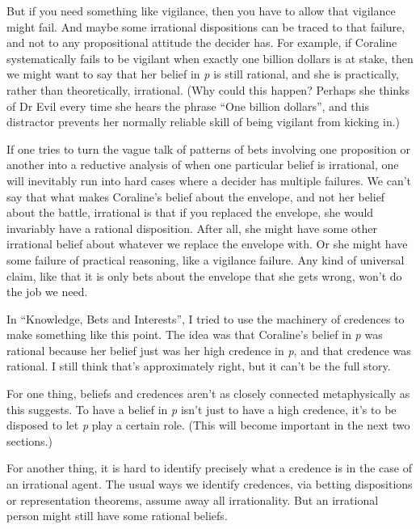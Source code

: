 \documentclass[
  11pt,
]{book}
\begin{document}
But if you need something like vigilance, then you have to allow that vigilance might fail. And maybe some irrational dispositions can be traced to that failure, and not to any propositional attitude the decider has. For example, if Coraline systematically fails to be vigilant when exactly one billion dollars is at stake, then we might want to say that her belief in \emph{p} is still rational, and she is practically, rather than theoretically, irrational. (Why could this happen? Perhaps she thinks of Dr Evil every time she hears the phrase ``One billion dollars'', and this distractor prevents her normally reliable skill of being vigilant from kicking in.)

If one tries to turn the vague talk of patterns of bets involving one proposition or another into a reductive analysis of when one particular belief is irrational, one will inevitably run into hard cases where a decider has multiple failures. We can't say that what makes Coraline's belief about the envelope, and not her belief about the battle, irrational is that if you replaced the envelope, she would invariably have a rational disposition. After all, she might have some other irrational belief about whatever we replace the envelope with. Or she might have some failure of practical reasoning, like a vigilance failure. Any kind of universal claim, like that it is only bets about the envelope that she gets wrong, won't do the job we need.

In ``Knowledge, Bets and Interests'', I tried to use the machinery of credences to make something like this point. The idea was that Coraline's belief in \emph{p} was rational because her belief just was her high credence in \emph{p}, and that credence was rational. I still think that's approximately right, but it can't be the full story.

For one thing, beliefs and credences aren't as closely connected metaphysically as this suggests. To have a belief in \emph{p} isn't just to have a high credence, it's to be disposed to let \emph{p} play a certain role. (This will become important in the next two sections.)

For another thing, it is hard to identify precisely what a credence is in the case of an irrational agent. The usual ways we identify credences, via betting dispositions or representation theorems, assume away all irrationality. But an irrational person might still have some rational beliefs.
\end{document}

